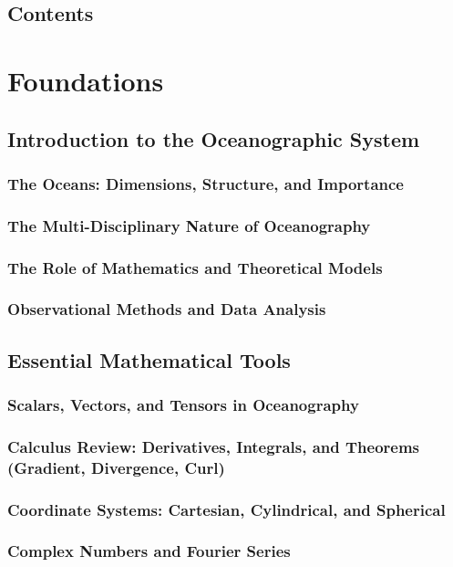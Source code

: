 \documentclass[12pt]{book}
\begin{document}
\frontmatter
\tableofcontents
\mainmatter

\chapter*{Contents}

\part{Foundations}
\chapter{Introduction to the Oceanographic System}
\section{The Oceans: Dimensions, Structure, and Importance}
\section{The Multi-Disciplinary Nature of Oceanography}
\section{The Role of Mathematics and Theoretical Models}
\section{Observational Methods and Data Analysis}

\chapter{Essential Mathematical Tools}
\section{Scalars, Vectors, and Tensors in Oceanography}
\section{Calculus Review: Derivatives, Integrals, and Theorems (Gradient, Divergence, Curl)}
\section{Coordinate Systems: Cartesian, Cylindrical, and Spherical}
\section{Complex Numbers and Fourier Series}
\end{document}
